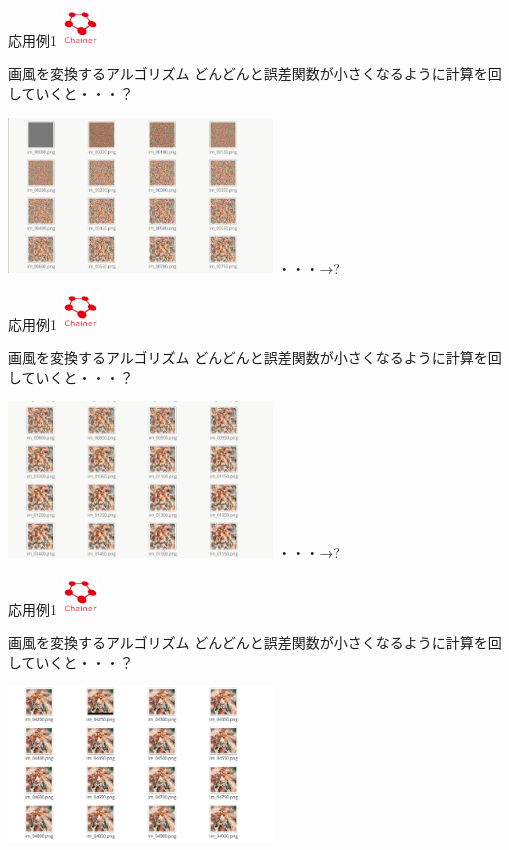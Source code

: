 \documentclass[12pt, unicode]{beamer}
\begin{document}
\begin{frame}{応用例1}
\includegraphics[clip,width=1.0cm]{image/chainer_logo.png}
\begin{block}{画風を変換するアルゴリズム}
どんどんと誤差関数が小さくなるように計算を回していくと・・・？
\end{block}
\includegraphics[clip,width=7.0cm]{image/Screenshot1.png}
・・・→\Large{?}
\end{frame}

\begin{frame}{応用例1}
\includegraphics[clip,width=1.0cm]{image/chainer_logo.png}
\begin{block}{画風を変換するアルゴリズム}
どんどんと誤差関数が小さくなるように計算を回していくと・・・？
\end{block}
\includegraphics[clip,width=7.0cm]{image/Screenshot2.png}
・・・→\Large{?}
\end{frame}

\begin{frame}{応用例1}
\includegraphics[clip,width=1.0cm]{image/chainer_logo.png}
\begin{block}{画風を変換するアルゴリズム}
どんどんと誤差関数が小さくなるように計算を回していくと・・・？
\end{block}
\includegraphics[clip,width=7.0cm]{image/Screenshot3.png}
\end{frame}
\end{document}
